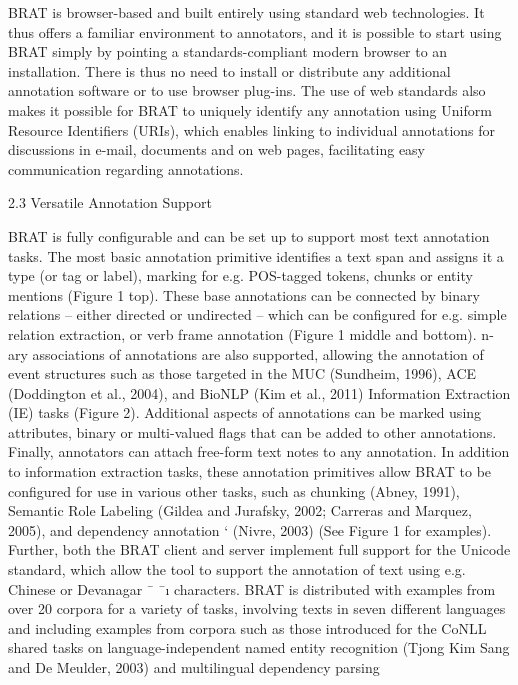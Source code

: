 \begin{description}
    BRAT is browser-based and built entirely using
    standard web technologies. It thus offers a familiar environment to annotators, and it is possible to start using BRAT simply by pointing a
    standards-compliant modern browser to an installation. There is thus no need to install or distribute any additional annotation software or to
    use browser plug-ins. The use of web standards
    also makes it possible for BRAT to uniquely identify any annotation using Uniform Resource Identifiers (URIs), which enables linking to individual
    annotations for discussions in e-mail, documents
    and on web pages, facilitating easy communication regarding annotations.
    
    2.3 Versatile Annotation Support
    
    BRAT is fully configurable and can be set up to
    support most text annotation tasks. The most basic annotation primitive identifies a text span and
    assigns it a type (or tag or label), marking for e.g.
    POS-tagged tokens, chunks or entity mentions
    (Figure 1 top). These base annotations can be
    connected by binary relations – either directed or
    undirected – which can be configured for e.g. simple relation extraction, or verb frame annotation
    (Figure 1 middle and bottom). n-ary associations
    of annotations are also supported, allowing the annotation of event structures such as those targeted
    in the MUC (Sundheim, 1996), ACE (Doddington
    et al., 2004), and BioNLP (Kim et al., 2011) Information Extraction (IE) tasks (Figure 2). Additional aspects of annotations can be marked using
    attributes, binary or multi-valued flags that can
    be added to other annotations. Finally, annotators
    can attach free-form text notes to any annotation.
    In addition to information extraction tasks,
    these annotation primitives allow BRAT to be
    configured for use in various other tasks, such
    as chunking (Abney, 1991), Semantic Role Labeling (Gildea and Jurafsky, 2002; Carreras
    and Marquez, 2005), and dependency annotation `
    (Nivre, 2003) (See Figure 1 for examples). Further, both the BRAT client and server implement
    full support for the Unicode standard, which allow the tool to support the annotation of text using e.g. Chinese or Devanagar ¯ ¯ı characters. BRAT
    is distributed with examples from over 20 corpora for a variety of tasks, involving texts in seven
    different languages and including examples from
    corpora such as those introduced for the CoNLL
    shared tasks on language-independent named entity recognition (Tjong Kim Sang and De Meulder, 2003) and multilingual dependency parsing

\end{description}
